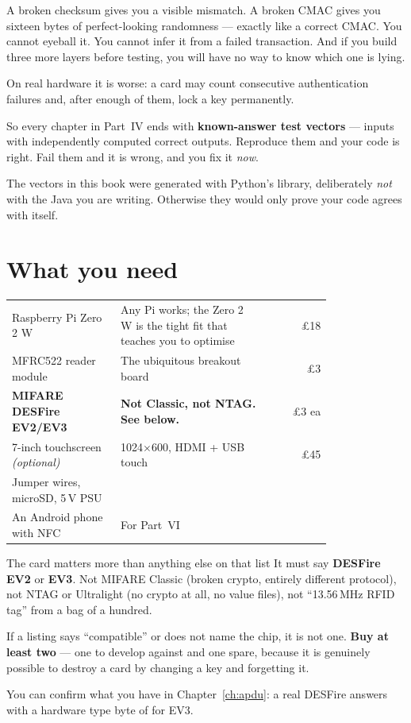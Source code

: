 A broken checksum gives you a visible mismatch. A broken CMAC gives you sixteen
bytes of perfect-looking randomness --- exactly like a correct CMAC. You cannot
eyeball it. You cannot infer it from a failed transaction. And if you build three
more layers before testing, you will have no way to know which one is lying.

On real hardware it is worse: a card may count consecutive authentication
failures and, after enough of them, lock a key permanently.

So every chapter in Part~IV ends with \textbf{known-answer test vectors} ---
inputs with independently computed correct outputs. Reproduce them and your code
is right. Fail them and it is wrong, and you fix it \emph{now}.

The vectors in this book were generated with Python's 
library, deliberately \emph{not} with the Java you are writing. Otherwise they
would only prove your code agrees with itself.

\section*{What you need}

\begin{center}\small
\begin{tabular}{@{}L{0.34\linewidth}L{0.46\linewidth}r@{}}
\toprule
{} &  &  \\
\midrule
Raspberry Pi Zero 2 W & Any Pi works; the Zero 2 W is the tight fit that teaches you to optimise & \pounds18 \\
MFRC522 reader module & The ubiquitous breakout board & \pounds3 \\
\textbf{MIFARE DESFire EV2/EV3} & \textbf{Not Classic, not NTAG. See below.} & \pounds3 ea \\
7-inch touchscreen \emph{(optional)} & 1024$\times$600, HDMI + USB touch & \pounds45 \\
Jumper wires, microSD, 5\,V PSU & & \\
An Android phone with NFC & For Part~VI & \\
\bottomrule
\end{tabular}
\end{center}

\begin{trap}{The card matters more than anything else on that list}
It must say \textbf{DESFire EV2} or \textbf{EV3}. Not MIFARE Classic (broken
crypto, entirely different protocol), not NTAG or Ultralight (no crypto at all,
no value files), not ``13.56\,MHz RFID tag'' from a bag of a hundred.

If a listing says ``compatible'' or does not name the chip, it is not one.
\textbf{Buy at least two} --- one to develop against and one spare, because it
is genuinely possible to destroy a card by changing a key and forgetting it.

You can confirm what you have in Chapter~\ref{ch:apdu}: a real DESFire answers
 with a hardware type byte of  for EV3.
\end{trap}

